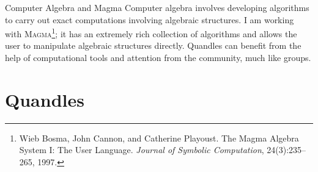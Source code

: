 \begin{frame}{Computer Algebra and Magma}
Computer algebra involves developing algorithms to carry out exact computations involving algebraic structures.\newline\newline
I am working with \textsc{Magma}\footnote{Wieb Bosma, John Cannon, and Catherine Playoust.  The Magma Algebra System I: The User Language. \textit{Journal of Symbolic Computation}, 24(3):235–265, 1997. \newline}; it has an extremely rich collection of algorithms and allows the user to manipulate algebraic structures directly.\newline\newline
Quandles can benefit from the help of computational tools and attention from the community, much like groups. 
\end{frame} 

\section{Quandles}
\frame{\sectionpage}

